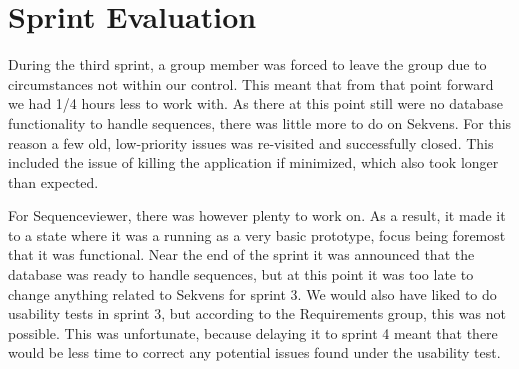 \section{Sprint Evaluation}
During the third sprint, a group member was forced to leave the group due to circumstances not within our control. This meant that from that point forward we had 1/4 hours less to work with.
As there at this point still were no database functionality to handle sequences, there was little more to do on Sekvens. For this reason a few old, low-priority issues was re-visited and successfully closed. This included the issue of killing the application if minimized, which also took longer than expected.

For Sequenceviewer, there was however plenty to work on. As a result, it made it to a state where it was a running as a very basic prototype, focus being foremost that it was functional. 
Near the end of the sprint it was announced that the database was ready to handle sequences, but at this point it was too late to change anything related to Sekvens for sprint 3.
We would also have liked to do usability tests in sprint 3, but according to the Requirements group, this was not possible. This was unfortunate, because delaying it to sprint 4 meant that there would be less time to correct any potential issues found under the usability test. 